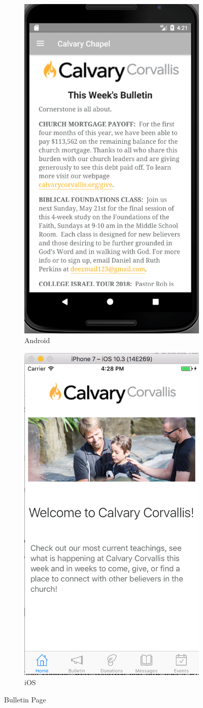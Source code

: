 \documentclass[letterpaper,10pt,draftclsnofoot,onecolumn,titlepage]{IEEEtran}
\begin{document}
		\begin{figure}[H]
			\centering
			\begin{subfigure}{.5\textwidth}
 				 \centering
  				 \includegraphics[width=.4\linewidth]{androidbulletin}
 				 \caption{Android}
  				 \label{fig:sub1}
			\end{subfigure}%
			\begin{subfigure}{.5\textwidth}
		         	\centering
 				 \includegraphics[width=.4\linewidth]{iosbulletin}
 				 \caption{iOS}
 				 \label{fig:sub2}
			\end{subfigure}
			\caption{Bulletin Page}
			\label{fig:bulletin}
		\end{figure}
\end{document}
